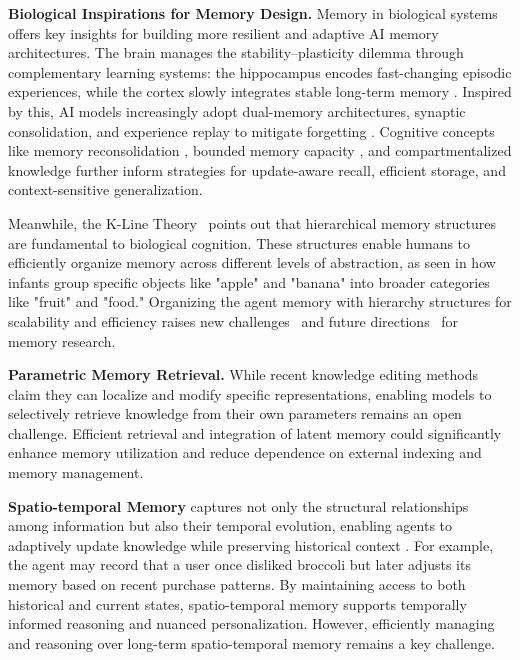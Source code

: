 \documentclass[manuscript,screen]{acmart}
\begin{document}
\par{\textbf{Biological Inspirations for Memory Design.}} Memory in biological systems offers key insights for building more resilient and adaptive AI memory architectures. The brain manages the stability–plasticity dilemma through complementary learning systems: the hippocampus encodes fast-changing episodic experiences, while the cortex slowly integrates stable long-term memory \citep{mcclelland1995complementary, kumaran2016learning}. Inspired by this, AI models increasingly adopt dual-memory architectures, synaptic consolidation, and experience replay to mitigate forgetting \citep{ritter2018meta, wang2021dual}. Cognitive concepts like memory reconsolidation \citep{dudai2015consolidation}, bounded memory capacity \citep{cowan2001magical}, and compartmentalized knowledge \citep{franklin2020structured} further inform strategies for update-aware recall, efficient storage, and context-sensitive generalization. 

Meanwhile, the K-Line Theory~\cite{MINSKY1980117} points out that hierarchical memory structures are fundamental to biological cognition. These structures enable humans to efficiently organize memory across different levels of abstraction, as seen in how infants group specific objects like "apple" and "banana" into broader categories like "fruit" and "food." Organizing the agent memory with hierarchy structures for scalability and efficiency raises new challenges~\cite{wang-etal-2024-abspyramid, han-etal-2025-concept} and future directions~\cite{wang-etal-2024-absinstruct, hong-etal-2024-abstraction} for memory research.

\par{\textbf{Parametric Memory Retrieval.}} While recent knowledge editing methods \citep{fang2025alphaedit, wang2024wise} claim they can localize and modify specific representations, enabling models to selectively retrieve knowledge from their own parameters remains an open challenge. Efficient retrieval and integration of latent memory could significantly enhance memory utilization and reduce dependence on external indexing and memory management.

\par{\textbf{Spatio-temporal Memory}} captures not only the structural relationships among information but also their temporal evolution, enabling agents \citep{lei2025stma} to adaptively update knowledge while preserving historical context \citep{zhao2025eventweave}. For example, the agent may record that a user once disliked broccoli but later adjusts its memory based on recent purchase patterns. By maintaining access to both historical and current states, spatio-temporal memory supports temporally informed reasoning and nuanced personalization. However, efficiently managing and reasoning over long-term spatio-temporal memory remains a key challenge.
\end{document}
